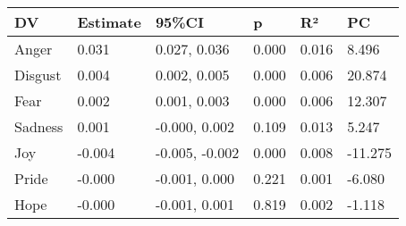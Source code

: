 \begin{tabular}{llllll}
\toprule
     DV & Estimate &         95\%CI &     p &    R² &  PC \\
\midrule
  Anger &    0.031 &   0.027, 0.036 & 0.000 & 0.016 &   8.496 \\
Disgust &    0.004 &   0.002, 0.005 & 0.000 & 0.006 &  20.874 \\
   Fear &    0.002 &   0.001, 0.003 & 0.000 & 0.006 &  12.307 \\
Sadness &    0.001 &  -0.000, 0.002 & 0.109 & 0.013 &   5.247 \\
    Joy &   -0.004 & -0.005, -0.002 & 0.000 & 0.008 & -11.275 \\
  Pride &   -0.000 &  -0.001, 0.000 & 0.221 & 0.001 &  -6.080 \\
   Hope &   -0.000 &  -0.001, 0.001 & 0.819 & 0.002 &  -1.118 \\
\bottomrule
\end{tabular}
